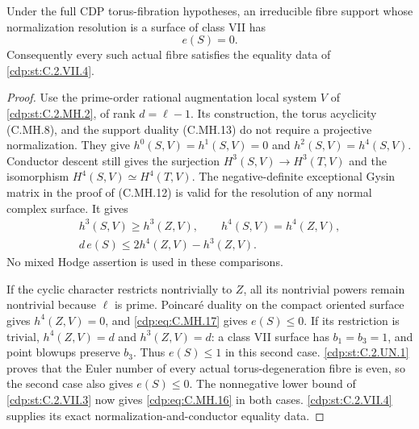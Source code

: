 
\begin{proposition}\label{cdp:st:C.2.MH.4}
Under the full CDP torus-fibration hypotheses, an
irreducible fibre support whose normalization resolution
is a surface of class VII has
\[
                              e(S)=0.
 \tag{C.MH.16}\label{cdp:eq:C.MH.16}
\]
Consequently every such actual fibre satisfies the
equality data of \ref{cdp:st:C.2.VII.4}.
\end{proposition}
\begin{proof}
Use the prime-order rational augmentation local system
$V$ of \ref{cdp:st:C.2.MH.2}, of rank $d=\ell-1$. Its construction,
the torus acyclicity (C.MH.8), and the support duality
(C.MH.13) do not require a projective normalization.
They give $h^0(S,V)=h^1(S,V)=0$ and
$h^2(S,V)=h^4(S,V)$. Conductor descent still gives the
surjection $H^3(S,V)\to H^3(T,V)$ and the isomorphism
$H^4(S,V)\simeq H^4(T,V)$. The negative-definite
exceptional Gysin matrix in the proof of (C.MH.12)
is valid for the resolution of any normal complex
surface. It gives
\[
 \begin{gathered}
 h^3(S,V)\ge h^3(Z,V),\qquad h^4(S,V)=h^4(Z,V),\\
 d\,e(S)\le 2h^4(Z,V)-h^3(Z,V).
 \end{gathered}
 \tag{C.MH.17}\label{cdp:eq:C.MH.17}
\]
No mixed Hodge assertion is used in these comparisons.

If the cyclic character restricts nontrivially to $Z$,
all its nontrivial powers remain nontrivial because
$\ell$ is prime. Poincar\'e duality on the compact
oriented surface gives $h^4(Z,V)=0$, and \eqref{cdp:eq:C.MH.17}
gives $e(S)\le0$. If its restriction is trivial,
$h^4(Z,V)=d$ and $h^3(Z,V)=d$: a class VII surface
has $b_1=b_3=1$, and point blowups preserve $b_3$.
Thus $e(S)\le1$ in this second case. \ref{cdp:st:C.2.UN.1} proves
that the Euler number of every actual torus-degeneration
fibre is even, so the second case also gives
$e(S)\le0$. The nonnegative lower bound of \ref{cdp:st:C.2.VII.3}
now gives \eqref{cdp:eq:C.MH.16} in both cases. \ref{cdp:st:C.2.VII.4} supplies
its exact normalization-and-conductor equality data.
\end{proof}


